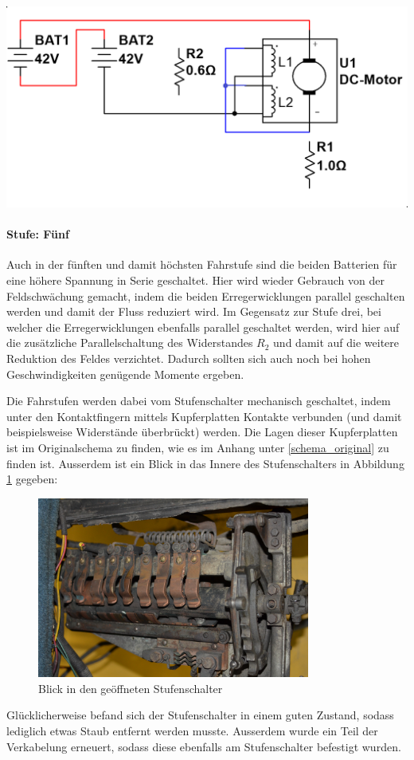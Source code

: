 \begin{minipage}{0.49\textwidth}
	\includegraphics[width=\columnwidth]{images/Stufenschalter/Stufe_5.png}%
\end{minipage}
\begin{minipage}{0.5\textwidth}
	\paragraph{Stufe: Fünf}
	Auch in der fünften und damit höchsten Fahrstufe sind die beiden Batterien für eine höhere Spannung in Serie geschaltet. Hier wird wieder Gebrauch von der Feldschwächung gemacht, indem die beiden Erregerwicklungen parallel geschalten werden und damit der Fluss reduziert wird. Im Gegensatz zur Stufe drei, bei welcher die Erregerwicklungen ebenfalls parallel geschaltet werden, wird hier auf die zusätzliche Parallelschaltung des Widerstandes $R_2$ und damit auf die weitere Reduktion des Feldes verzichtet. Dadurch sollten sich auch noch bei hohen Geschwindigkeiten genügende Momente ergeben.
\end{minipage}

Die Fahrstufen werden dabei vom Stufenschalter mechanisch geschaltet, indem unter den Kontaktfingern mittels Kupferplatten Kontakte verbunden (und damit beispielsweise Widerstände überbrückt) werden. Die Lagen dieser Kupferplatten ist im Originalschema zu finden, wie es im Anhang unter \ref{schema_original} zu finden ist. Ausserdem ist ein Blick in das Innere des Stufenschalters in Abbildung \ref{fig:Stufenschalter} gegeben:

\begin{figure}[h]
	\centering
		\includegraphics[width=0.8\textwidth]{images/Stufenschalter/Foto}
	\caption{Blick in den geöffneten Stufenschalter}
	\label{fig:Stufenschalter}
\end{figure}

Glücklicherweise befand sich der Stufenschalter in einem guten Zustand, sodass lediglich etwas Staub entfernt werden musste. Ausserdem wurde ein Teil der Verkabelung erneuert, sodass diese ebenfalls am Stufenschalter befestigt wurden.

\newpage